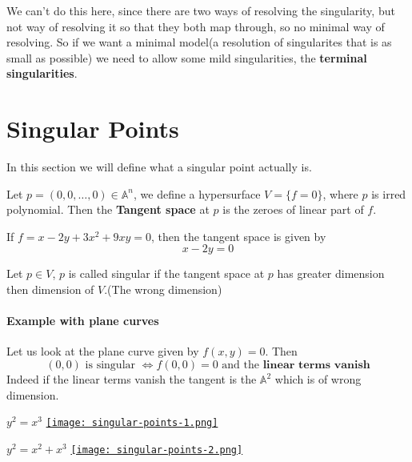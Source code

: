 We can't do this here, since there are two ways of resolving the singularity, but not way of resolving it so that they both map through, so no minimal way of resolving. So if we want a minimal model(a resolution of singularites that is as small as possible) we need to allow some mild singularities, the \textbf{terminal singularities}.  

\section{Singular Points}

In this section we will define what a singular point actually is.

\begin{definition}
    Let $p = (0,0,\ldots,0)\in \mathbb{A}^n$, we define a hypersurface $V = \{f=0\}$, where $p$ is irred polynomial. Then the \textbf{Tangent space} at $p$ is the zeroes of linear part of $f$.
    
    \begin{example}
        If $f = x - 2y + 3x^2+9xy = 0$, then the tangent space is given by \[x-2y = 0\]
    \end{example}
\end{definition}


\begin{definition}
    Let $p\in V$, $p$ is called singular if the tangent space at $p$ has greater dimension then dimension of $V$.(The wrong dimension)
\end{definition}
\paragraph*{Example with plane curves}

Let us look at the plane curve given by $f(x,y) = 0$. Then
 \[(0,0) \text{ is singular } \iff f(0,0) = 0 \text{ and the }\textbf{linear terms vanish}\]
Indeed if the linear terms vanish the tangent is the $\mathbb{A}^2$ which is of wrong dimension.

\begin{example}
    \begin{center}
        $y^2 = x^3$
        \href{https://youtu.be/U6czoljbt4g?t=292}{\texttt{[image: singular-points-1.png]}}
    \end{center}

    \begin{center}
        $y^2 = x^2+x^3$
        \href{https://youtu.be/U6czoljbt4g?t=292}{\texttt{[image: singular-points-2.png]}}
    \end{center}
\end{example}

